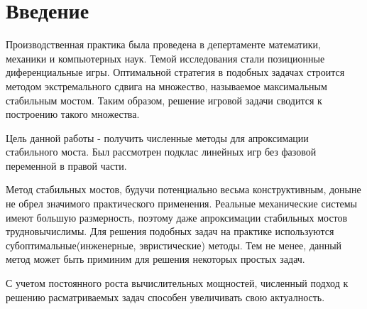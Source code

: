 \section{Введение}
 
Производственная практика была проведена в депертаменте математики,
механики и компьютерных наук.
Темой исследования стали позиционные диференциальные игры.
Оптимальной стратегия в подобных задачах
строится методом экстремального сдвига на множество,
называемое максимальным стабильным мостом.
Таким образом, решение игровой задачи сводится к построению такого множества.

Цель данной работы - получить численные методы для апроксимации стабильного моста.
Был рассмотрен подклас линейных игр без фазовой переменной в правой части.

Метод стабильных мостов, будучи потенциально весьма конструктивным,
доныне не обрел значимого практического применения.
Реальные механические системы имеют большую размерность,
поэтому даже апроксимации стабильных мостов трудновычислимы.
Для решения подобных задач на практике используются
субоптимальные(инженерные, эвристические) методы.
Тем не менее, данный метод может быть приминим для решения некоторых простых задач.

С учетом постоянного роста вычислительных мощностей, 
численный подход к решению расматриваемых задач
способен увеличивать свою актуалность.
